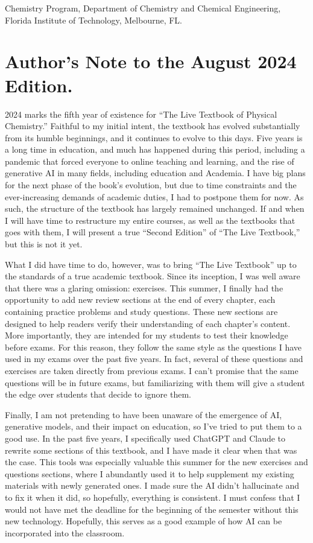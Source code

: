 \documentclass[
  9pt,
]{extbook}
\theoremstyle{definition}
\theoremstyle{definition}
\theoremstyle{definition}
\theoremstyle{definition}
\theoremstyle{remark}
\begin{document}
Chemistry Program, Department of Chemistry and Chemical Engineering,
Florida Institute of Technology, Melbourne, FL.

\section*{Author's Note to the August 2024 Edition.}\label{authors-note-to-the-august-2024-edition.}

2024 marks the fifth year of existence for ``The Live Textbook of Physical Chemistry.'' Faithful to my initial intent, the textbook has evolved substantially from its humble beginnings, and it continues to evolve to this days. Five years is a long time in education, and much has happened during this period, including a pandemic that forced everyone to online teaching and learning, and the rise of generative AI in many fields, including education and Academia. I have big plans for the next phase of the book's evolution, but due to time constraints and the ever-increasing demands of academic duties, I had to postpone them for now. As such, the structure of the textbook has largely remained unchanged. If and when I will have time to restructure my entire courses, as well as the textbooks that goes with them, I will present a true ``Second Edition'' of ``The Live Textbook,'' but this is not it yet.

What I did have time to do, however, was to bring ``The Live Textbook'' up to the standards of a true academic textbook. Since its inception, I was well aware that there was a glaring omission: exercises. This summer, I finally had the opportunity to add new review sections at the end of every chapter, each containing practice problems and study questions. These new sections are designed to help readers verify their understanding of each chapter's content. More importantly, they are intended for my students to test their knowledge before exams. For this reason, they follow the same style as the questions I have used in my exams over the past five years. In fact, several of these questions and exercises are taken directly from previous exams. I can't promise that the same questions will be in future exams, but familiarizing with them will give a student the edge over students that decide to ignore them.

Finally, I am not pretending to have been unaware of the emergence of AI, generative models, and their impact on education, so I've tried to put them to a good use. In the past five years, I specifically used ChatGPT and Claude to rewrite some sections of this textbook, and I have made it clear when that was the case. This tools was especially valuable this summer for the new exercises and questions sections, where I abundantly used it to help supplement my existing materials with newly generated ones. I made sure the AI didn't hallucinate and to fix it when it did, so hopefully, everything is consistent. I must confess that I would not have met the deadline for the beginning of the semester without this new technology. Hopefully, this serves as a good example of how AI can be incorporated into the classroom.
\end{document}
